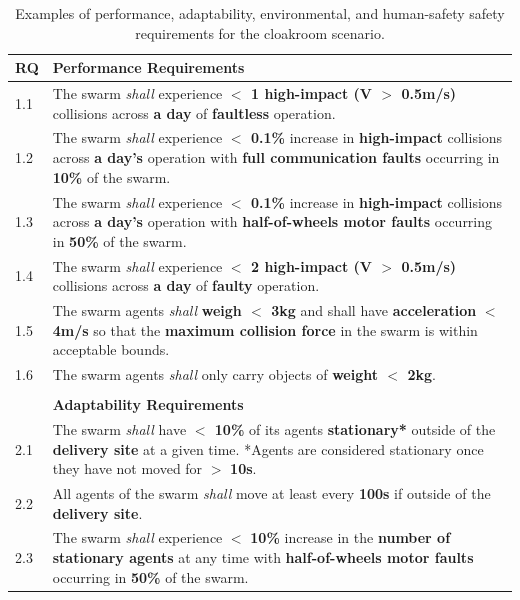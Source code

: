 \documentclass[runningheads]{llncs}
\begin{document}
	\begin{table}[!t]
		\centering
		\caption{Examples of performance, adaptability, environmental, and human-safety safety requirements for the cloakroom scenario.}
		\label{tab:reqs}
		\begin{tabular}{p{5mm} p{125mm} }%
		\textbf{RQ} & \textbf{Performance Requirements}\\
		\hline
		1.1 & The swarm \emph{shall} experience \textbf{$<$ 1 high-impact (V $>$ 0.5m/s)} collisions across \textbf{a day} of \textbf{faultless} operation. \\ 
		\hline
		1.2 & The swarm \emph{shall} experience \textbf{$<$ 0.1\%} increase in \textbf{high-impact} collisions across \textbf{a day's} operation with \textbf{full communication faults} occurring in \textbf{10\%} of the swarm.\\ 
		\hline
		1.3 & The swarm \emph{shall} experience \textbf{$<$ 0.1\%} increase in \textbf{high-impact} collisions across \textbf{a day's} operation with \textbf{half-of-wheels motor faults} occurring in \textbf{50\%} of the swarm.	\\	
		\hline
		1.4 & The swarm \emph{shall} experience \textbf{$<$ 2 high-impact (V $>$ 0.5m/s)} collisions across \textbf{a day} of \textbf{faulty} operation.  \\		 		
		\hline
		1.5 & The swarm agents \emph{shall} \textbf{weigh $<$ 3kg} and shall have \textbf{acceleration} \textbf{$<$ 4m/s} so that the \textbf{maximum collision force} in the swarm is within acceptable bounds. \\
		\hline
		1.6 & The swarm agents \emph{shall} only carry objects of \textbf{weight $<$ 2kg}. \\ 
		\hline \\[-1.25\medskipamount]
		& \textbf{Adaptability Requirements}\\
		\hline
		2.1 & The swarm \emph{shall} have \textbf{$<$ 10\%} of its agents \textbf{stationary*} outside of the \textbf{delivery site} at a given time. *Agents are considered stationary once they have not moved for $>$ \textbf{10s}.
		\\ 
		\hline
		2.2 & All agents of the swarm \emph{shall} move at least every \textbf{100s} if outside of the \textbf{delivery site}.\\ 
		\hline
		2.3 & The swarm \emph{shall} experience $<$ \textbf{10\%} increase in the \textbf{number of stationary agents} at any time with \textbf{half-of-wheels motor faults} occurring in \textbf{50\%} of the swarm. \\

\end{tabular}
\end{table}
\end{document}
